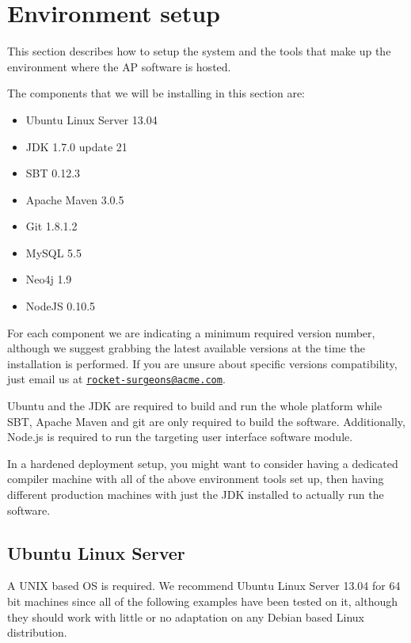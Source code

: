 \section{Environment setup}

This section describes how to setup the system and the tools that make
up the environment where the \ac{AP} software is hosted. 

The components that we will be installing in this section are:

\begin{itemize}
  \item Ubuntu Linux Server 13.04
  \item \ac{JDK} 1.7.0 update 21
  \item \ac{SBT} 0.12.3
  \item Apache Maven 3.0.5
  \item Git 1.8.1.2
  \item MySQL 5.5
  \item Neo4j 1.9
  \item NodeJS 0.10.5
\end{itemize}

For each component we are indicating a minimum required version number,
although we suggest grabbing the latest available versions at the time
the installation is performed. If you are unsure about specific versions
compatibility, just email us at
\href{mailto:rocket-surgeons@acme.com}{\texttt{rocket-surgeons@acme.com}}.

Ubuntu and the \ac{JDK} are required to build and run the whole platform
while \ac{SBT}, Apache Maven and git are only required to build the
software. Additionally, Node.js is required to run the targeting user
interface software module.

In a hardened deployment setup, you might want to consider having a
dedicated compiler machine with all of the above environment tools set
up, then having different production machines with just the \ac{JDK}
installed to actually run the software.

\subsection{Ubuntu Linux Server}

A UNIX based \ac{OS} is required. We recommend Ubuntu Linux Server 13.04
for 64 bit machines since all of the following examples have been tested
on it, although they should work with little or no adaptation on any
Debian based Linux distribution. 

